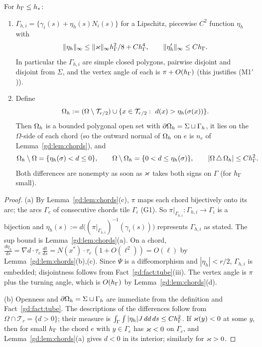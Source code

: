 \begin{lemma}\label{gd:lem:graph}
For $h_\Gamma\le h_\ast$:
\begin{enumerate}[label=(\alph*)]
\item $\Gamma_{h,i}=\{\gamma_i(s)+\eta_h(s)N_i(s)\}$ for a Lipschitz, piecewise $C^2$ function $\eta_h$ with
\[
\lVert \eta_h\rVert_\infty\le\lVert \varkappa\rVert_\infty h_\Gamma^2/8+Ch_\Gamma^4,\qquad\lVert \eta_h'\rVert_\infty\le Ch_\Gamma .
\]
In particular the $\Gamma_{h,i}$ are simple closed polygons, pairwise disjoint and disjoint from $\Sigma$, and the vertex angle of each is $\pi+O(h_\Gamma)$ (this justifies (M1$'$)).
\item Define
\[
\Oh:=(\Omega\setminus\mathcal T_{r/2})\cup\{x\in\mathcal T_{r/2}:\ d(x)>\eta_h(\sigma(x))\}.
\]
Then $\Omega_h$ is a bounded polygonal open set with $\partial\Omega_h=\Sigma\sqcup\Gamma_h$, it lies on the $\Omega$-side of each chord (so the outward normal of $\Omega_h$ on $e$ is $n_e$ of Lemma~\ref{gd:lem:chords}), and
\[
\Omega_h\setminus\Omega=\{\eta_h(\sigma)<d\le0\},\qquad\Omega\setminus\Omega_h=\{0<d\le\eta_h(\sigma)\},\qquad|\Omega\,\triangle\,\Omega_h|\le Ch_\Gamma^2 .
\]
Both differences are nonempty as soon as $\varkappa$ takes both signs on $\Gamma$ (for $h_\Gamma$ small).
\end{enumerate}
\end{lemma}

\begin{proof}
(a) By Lemma~\ref{gd:lem:chords}(c), $\pi$ maps each chord bijectively onto its arc; the arcs $\Gamma_e$ of consecutive chords tile $\Gamma_i$ (G1). So $\pi|_{\Gamma_{h,i}}:\Gamma_{h,i}\to\Gamma_i$ is a bijection and $\eta_h(s):=d\bigl((\pi|_{\Gamma_{h,i}})^{-1}(\gamma_i(s))\bigr)$ represents $\Gamma_{h,i}$ as stated. The sup bound is Lemma~\ref{gd:lem:chords}(a). On a chord, $\frac{d\eta_h}{ds}=\nabla d\cdot\tau_e\,\frac{dt}{ds}=N(x^\ast)\cdot\tau_e\,(1+O(\ell^2))=O(\ell)$ by Lemma~\ref{gd:lem:chords}(b),(c). Since $\Psi$ is a diffeomorphism and $|\eta_h|<r/2$, $\Gamma_{h,i}$ is embedded; disjointness follows from Fact~\ref{gd:fact:tube}(iii). The vertex angle is $\pi$ plus the turning angle, which is $O(h_\Gamma)$ by Lemma~\ref{gd:lem:chords}(d).

(b) Openness and $\partial\Omega_h=\Sigma\sqcup\Gamma_h$ are immediate from the definition and Fact~\ref{gd:fact:tube}. The descriptions of the differences follow from $\Omega\cap\mathcal T_r=\{d>0\}$; their measure is $\int_\Gamma\int|\eta_h|J\,dd\,ds\le Ch_\Gamma^2$. If $\varkappa(y)<0$ at some $y$, then for small $h_\Gamma$ the chord $e$ with $y\in\Gamma_e$ has $\varkappa<0$ on $\Gamma_e$, and Lemma~\ref{gd:lem:chords}(a) gives $d<0$ in its interior; similarly for $\varkappa>0$.
\end{proof}

